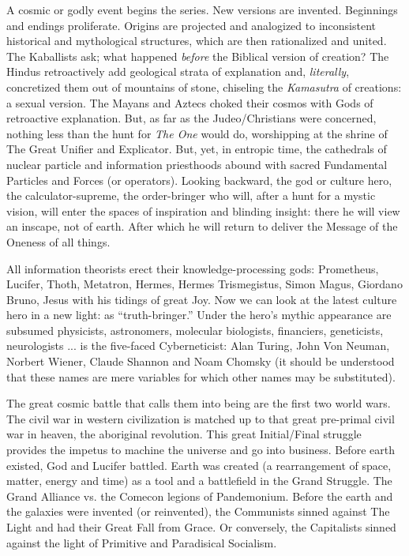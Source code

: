 \documentclass[11pt,twoside,draft]{memoir}
\begin{document}
A cosmic or godly event begins the series.
New versions are invented. Beginnings and
endings proliferate. Origins are projected
and analogized to inconsistent historical
and mythological structures, which are then
rationalized and united. The Kaballists ask;
what happened \emph{before} the Biblical version of
creation? The Hindus retroactively add geological strata of explanation and, \emph{literally},
concretized them out of mountains of stone,
chiseling the \emph{Kamasutra} of creations:
a sexual version. The Mayans and Aztecs choked
their cosmos with Gods of retroactive explanation.
But, as far as the Judeo\slash Christians
were concerned, nothing less than the hunt
for \emph{The One} would do, worshipping at the
shrine of The Great Unifier and Explicator.
But, yet, in entropic time, the cathedrals of
nuclear particle and information priesthoods
abound with sacred Fundamental Particles
and Forces (or operators). Looking backward,
the god or culture hero, the calculator-supreme, the order-bringer who will, after a
hunt for a mystic vision, will enter the
spaces of inspiration and blinding insight:
there he will view an inscape, not of earth.
After which he will return to deliver the
Message of the Oneness of all things.

All information theorists erect their knowledge-processing gods: Prometheus, Lucifer,
Thoth, Metatron, Hermes, Hermes Trismegistus, Simon Magus, Giordano Bruno, Jesus
with his tidings of great Joy. Now we can
look at the latest culture hero in a new light:
as \enquote{truth-bringer.} Under the hero's mythic
appearance are subsumed physicists, astronomers, 
molecular biologists, financiers, geneticists, neurologists ... is the five-faced
Cyberneticist: Alan Turing, John Von Neuman, Norbert Wiener, Claude Shannon and
Noam Chomsky (it should be understood that these names are mere variables for
which other names may be substituted).

The great cosmic battle that calls them
into being are the first two world wars. The
civil war in western civilization is matched
up to that great pre-primal civil war in
heaven, the aboriginal revolution. This great
Initial\slash Final struggle provides the impetus
to machine the universe and go into business. Before earth existed, God and Lucifer
battled. Earth was created (a rearrangement
of space, matter, energy and time) as a tool
and a battlefield in the Grand Struggle. The
Grand Alliance vs. the Comecon legions of
Pandemonium. Before the earth and the
galaxies were invented (or reinvented), the
Communists sinned against The Light and
had their Great Fall from Grace. Or conversely, the Capitalists sinned against the
light of Primitive and Paradisical Socialism.
\end{document}
